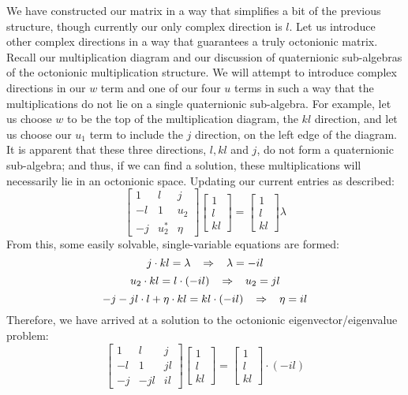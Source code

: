 \documentclass{article}
\theoremstyle{plain}
\begin{document}
We have constructed our matrix in a way that simplifies a bit of the previous structure, though currently our only complex direction is $l$. Let us introduce other complex directions in a way that guarantees a truly octonionic matrix. Recall our multiplication diagram and our discussion of quaternionic sub-algebras of the octonionic multiplication structure. We will attempt to introduce complex directions in our $w$ term and one of our four $u$ terms in such a way that the multiplications do not lie on a single quaternionic sub-algebra. For example, let us choose $w$ to be the top of the multiplication diagram, the $kl$ direction, and let us choose our $u_1$ term to include the $j$ direction, on the left edge of the diagram. It is apparent that these three directions, $l,kl$ and $j$, do not form a quaternionic sub-algebra; and thus, if we can find a solution, these multiplications will necessarily lie in an octonionic space. Updating our current entries as described:
$$
\begin{bmatrix}
1 & l & j\\
-l & 1 & u_2\\
-j & u_2^* & \eta
\end{bmatrix}
\begin{bmatrix}
1\\
l\\
kl
\end{bmatrix}=\begin{bmatrix}
1\\
l\\
kl
\end{bmatrix}\lambda
$$
From this, some easily solvable, single-variable equations are formed:
$$j\cdot kl = \lambda \hspace{3mm} \Rightarrow \hspace{3mm} \lambda = -il$$
$$u_2 \cdot kl = l \cdot (-il) \hspace{3mm} \Rightarrow \hspace{3mm} u_2 = jl$$
$$-j - jl\cdot l + \eta \cdot kl = kl \cdot (-il) \hspace{3mm} \Rightarrow \hspace{3mm} \eta = il$$
Therefore, we have arrived at a solution to the octonionic eigenvector/eigenvalue problem:
$$
\begin{bmatrix}
1 & l & j\\
-l & 1 & jl\\
-j & -jl & il
\end{bmatrix}
\begin{bmatrix}
1\\
l\\
kl
\end{bmatrix}=\begin{bmatrix}
1\\
l\\
kl
\end{bmatrix}\cdot (-il)
$$
\end{document}
